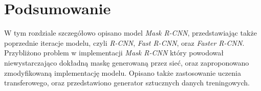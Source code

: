 \section{Podsumowanie}
W tym rozdziale szczegółowo opisano model \textit{Mask R-CNN}, przedstawiając także poprzednie iteracje modelu, czyli \textit{R-CNN}, \textit{Fast R-CNN}, oraz \textit{Faster R-CNN}.
Przybliżono problem w implementacji \textit{Mask R-CNN} który powodował niewystarczająco dokładną maskę generowaną przez sieć, oraz zaproponowano zmodyfikowaną implementację modelu.
Opisano także zastosowanie uczenia transferowego, oraz przedstawiono generator sztucznych danych treningowych.